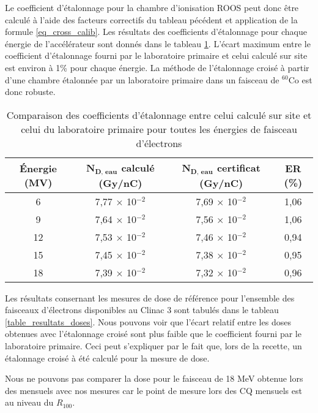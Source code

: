\documentclass{article}
\begin{document}
Le coefficient d'étalonnage pour la chambre d'ionisation ROOS peut donc être calculé à l'aide des facteurs correctifs du tableau pécédent et application de la formule \ref*{eq_cross_calib}. Les résultats des coefficients d'étalonnage pour chaque énergie de l'accélérateur sont donnés dans le tableau \ref*{table_coeff_etal_energies}. L'écart maximum entre le coefficient d'étalonnage fourni par le laboratoire primaire et celui calculé sur site est environ à 1\% pour chaque énergie. La méthode de l'étalonnage croisé à partir d'une chambre étalonnée par un laboratoire primaire dans un faisceau de $^{60}$Co est donc robuste.

\begin{table}[h]
  \centering
  \begin{tabular}{cccc}
    \toprule
    \textbf{Énergie (MV)} & $\mathbf{N_{D,\, eau}}$ \textbf{calculé (Gy/nC)} & $\mathbf{N_{D,\, eau}}$ \textbf{certificat (Gy/nC)} & \textbf{ER (\%)} \\
    \toprule
    6 & 7,77 $\times$ 10$^{-2}$ & 7,69 $\times$ 10$^{-2}$ & 1,06 \\
    9 & 7,64 $\times$ 10$^{-2}$ & 7,56 $\times$ 10$^{-2}$ & 1,06 \\
    12 & 7,53 $\times$ 10$^{-2}$ & 7,46 $\times$ 10$^{-2}$ & 0,94 \\
    15 & 7,45 $\times$ 10$^{-2}$ & 7,38 $\times$ 10$^{-2}$ & 0,95 \\
    18 & 7,39 $\times$ 10$^{-2}$ & 7,32 $\times$ 10$^{-2}$ & 0,96 \\
    \bottomrule
  \end{tabular}
  \caption{Comparaison des coefficients d'étalonnage entre celui calculé sur site et celui du laboratoire primaire pour toutes les énergies de faisceau d'électrons}
  \label{table_coeff_etal_energies}
\end{table}

Les résultats consernant les mesures de dose de référence pour l'ensemble des faisceaux d'électrons disponibles au Clinac 3 sont tabulés dans le tableau \ref*{table_resultats_doses}. Nous pouvons voir que l'écart relatif entre les doses obtenues avec l'étalonnage croisé sont plus faible que le coefficient fourni par le laboratoire primaire. Ceci peut s'expliquer par le fait que, lors de la recette, un étalonnage croisé à été calculé pour la mesure de dose.

Nous ne pouvons pas comparer la dose pour le faisceau de 18 MeV obtenue lors des mensuels avec nos mesures car le point de mesure lors des CQ mensuels est au niveau du $R_{100}$.
\end{document}
